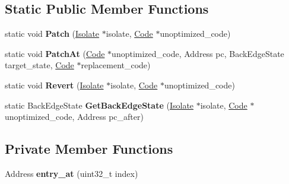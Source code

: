 \subsection*{Static Public Member Functions}
\begin{DoxyCompactItemize}
\item 
static void {\bfseries Patch} (\hyperlink{classv8_1_1internal_1_1_isolate}{Isolate} $\ast$isolate, \hyperlink{classv8_1_1internal_1_1_code}{Code} $\ast$unoptimized\+\_\+code)\hypertarget{classv8_1_1internal_1_1_back_edge_table_a948f9633cd9b7de2c75db208b687329a}{}\label{classv8_1_1internal_1_1_back_edge_table_a948f9633cd9b7de2c75db208b687329a}

\item 
static void {\bfseries Patch\+At} (\hyperlink{classv8_1_1internal_1_1_code}{Code} $\ast$unoptimized\+\_\+code, Address pc, Back\+Edge\+State target\+\_\+state, \hyperlink{classv8_1_1internal_1_1_code}{Code} $\ast$replacement\+\_\+code)\hypertarget{classv8_1_1internal_1_1_back_edge_table_a6c051f1b5eca4c03f8f3147c71ac051c}{}\label{classv8_1_1internal_1_1_back_edge_table_a6c051f1b5eca4c03f8f3147c71ac051c}

\item 
static void {\bfseries Revert} (\hyperlink{classv8_1_1internal_1_1_isolate}{Isolate} $\ast$isolate, \hyperlink{classv8_1_1internal_1_1_code}{Code} $\ast$unoptimized\+\_\+code)\hypertarget{classv8_1_1internal_1_1_back_edge_table_aa4a8da5df024f0696f8be96ec8f5dbec}{}\label{classv8_1_1internal_1_1_back_edge_table_aa4a8da5df024f0696f8be96ec8f5dbec}

\item 
static Back\+Edge\+State {\bfseries Get\+Back\+Edge\+State} (\hyperlink{classv8_1_1internal_1_1_isolate}{Isolate} $\ast$isolate, \hyperlink{classv8_1_1internal_1_1_code}{Code} $\ast$unoptimized\+\_\+code, Address pc\+\_\+after)\hypertarget{classv8_1_1internal_1_1_back_edge_table_ae4104ee5562bfe57be87eb6ce940ed73}{}\label{classv8_1_1internal_1_1_back_edge_table_ae4104ee5562bfe57be87eb6ce940ed73}

\end{DoxyCompactItemize}
\subsection*{Private Member Functions}
\begin{DoxyCompactItemize}
\item 
Address {\bfseries entry\+\_\+at} (uint32\+\_\+t index)\hypertarget{classv8_1_1internal_1_1_back_edge_table_a981fbd793660c614f3d1ea56368b85d8}{}\label{classv8_1_1internal_1_1_back_edge_table_a981fbd793660c614f3d1ea56368b85d8}

\end{DoxyCompactItemize}
